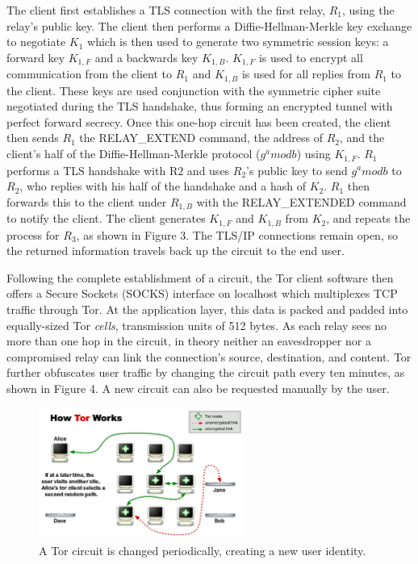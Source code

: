 The client first establishes a TLS connection with the first relay, $R_{1}$, using the relay's public key. The client then performs a Diffie-Hellman-Merkle key exchange to negotiate $K_{1}$ which is then used to generate two symmetric session keys: a forward key $K_{1,F}$ and a backwards key $K_{1,B}$. $K_{1,F}$ is used to encrypt all communication from the client to $R_{1}$ and $K_{1,B}$ is used for all replies from $R_{1}$ to the client. These keys are used conjunction with the symmetric cipher suite negotiated during the TLS handshake, thus forming an encrypted tunnel with perfect forward secrecy. Once this one-hop circuit has been created, the client then sends $R_{1}$ the RELAY\_EXTEND command, the address of $R_{2}$, and the client's half of the Diffie-Hellman-Merkle protocol ($ g^a mod b $) using $K_{1,F}$. $R_{1}$ performs a TLS handshake with R${2}$ and uses $R_{2}$'s public key to send $ g^a mod b $ to $R_{2}$, who replies with his half of the handshake and a hash of $K_{2}$. $R_{1}$ then forwards this to the client under $R_{1,B}$ with the RELAY\_EXTENDED command to notify the client. The client generates $K_{1,F}$ and $K_{1,B}$ from $K_{2}$, and repeats the process for $R_{3}$,\cite{Ling2012} as shown in Figure 3. The TLS/IP connections remain open, so the returned information travels back up the circuit to the end user.

Following the complete establishment of a circuit, the Tor client software then offers a Secure Sockets (SOCKS) interface on localhost which multiplexes TCP traffic through Tor. At the application layer, this data is packed and padded into equally-sized Tor \textit{cells}, transmission units of 512 bytes. As each relay sees no more than one hop in the circuit, in theory neither an eavesdropper nor a compromised relay can link the connection's source, destination, and content. Tor further obfuscates user traffic by changing the circuit path every ten minutes,\cite{McCoy2008} as shown in Figure 4. A new circuit can also be requested manually by the user.

\begin{figure}[htbp]
	\centering
	\includegraphics[width=0.6\textwidth]{images/circuit-change-1-4.png}
	\caption{A Tor circuit is changed periodically, creating a new user identity.}
	\label{fig:figure1}
\end{figure}

